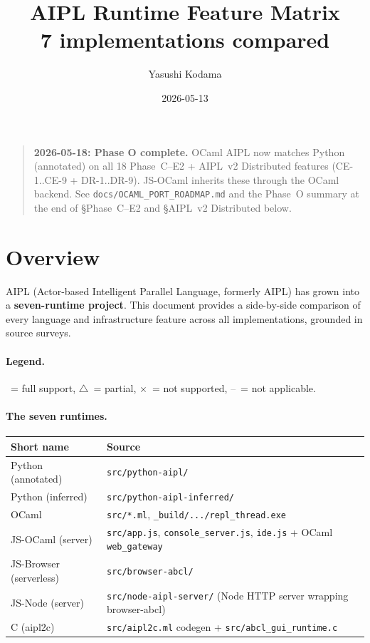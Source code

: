 \documentclass[10pt,a4paper,landscape]{article}
\title{\textbf{AIPL Runtime Feature Matrix} \\
  {\large 7 implementations compared}}
\author{Yasushi Kodama}
\date{2026-05-13}
\newcommand{\Yes}{\textcolor{green!50!black}{\textbf{\checkmark}}}
\newcommand{\No}{\textcolor{red!70!black}{$\times$}}
\newcommand{\Part}{\textcolor{orange!80!black}{$\triangle$}}
\newcommand{\NA}{\textcolor{gray}{--}}
\begin{document}
\maketitle

\begin{quote}
\textbf{2026-05-18: Phase O complete.}  OCaml AIPL now matches
Python (annotated) on all 18 Phase~C--E2 + AIPL~v2 Distributed
features (CE-1..CE-9 + DR-1..DR-9).  JS-OCaml inherits these
through the OCaml backend.  See \texttt{docs/OCAML\_PORT\_ROADMAP.md}
and the Phase~O summary at the end of \S Phase~C--E2 and
\S AIPL~v2 Distributed below.
\end{quote}

\section*{Overview}

AIPL (Actor-based Intelligent Parallel Language, formerly AIPL)
has grown into a \textbf{seven-runtime project}.  This document
provides a side-by-side comparison of every language and
infrastructure feature across all implementations, grounded in
source surveys.

\paragraph{Legend.}
\Yes\ = full support, \Part\ = partial, \No\ = not supported,
\NA\ = not applicable.

\paragraph{The seven runtimes.}

\begin{tabularx}{\linewidth}{l X}
  \toprule
  \textbf{Short name} & \textbf{Source} \\
  \midrule
  Python (annotated)        & \texttt{src/python-aipl/} \\
  Python (inferred)         & \texttt{src/python-aipl-inferred/} \\
  OCaml                     & \texttt{src/*.ml}, \texttt{\_build/.../repl\_thread.exe} \\
  JS-OCaml (server)         & \texttt{src/app.js}, \texttt{console\_server.js}, \texttt{ide.js} + OCaml \texttt{web\_gateway} \\
  JS-Browser (serverless)   & \texttt{src/browser-abcl/} \\
  JS-Node (server)          & \texttt{src/node-aipl-server/} (Node HTTP server wrapping browser-abcl) \\
  C (aipl2c)                & \texttt{src/aipl2c.ml} codegen + \texttt{src/abcl\_gui\_runtime.c} \\
  \bottomrule
\end{tabularx}
\end{document}
